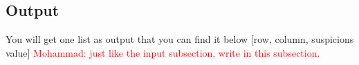 \documentclass[12pt]{article}
\newcommand{\mohammad}[1]{\textcolor{red}{Mohammad: #1}}
\begin{document}
\subsection{Output}
You will get one list as output that you can find it below
[row, column, suspicions value]
\mohammad{just like the input subsection, write in this subsection.}




\end{document}
